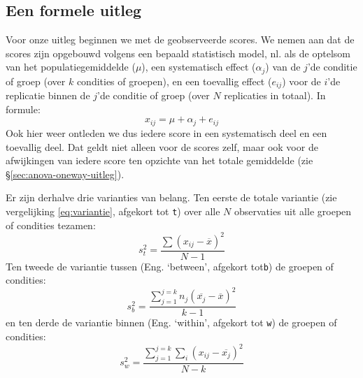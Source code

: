 \documentclass[
]{book}
\begin{document}
\subsection{Een formele uitleg}\label{sec:anova-oneway-formeel}

Voor onze uitleg beginnen we met de geobserveerde scores. We nemen aan
dat de scores zijn opgebouwd volgens een bepaald statistisch model, nl.
als de optelsom van het populatiegemiddelde (\(\mu\)), een systematisch
effect (\(\alpha_j\)) van de \(j\)'de conditie of groep (over \(k\) condities
of groepen), en een toevallig effect (\(e_{ij}\)) voor de \(i\)'de
replicatie binnen de \(j\)'de conditie of groep (over \(N\) replicaties in
totaal). In formule:
\[x_{ij} = \mu + \alpha_{j} + e_{ij}\]
Ook hier
weer ontleden we dus iedere score in een systematisch deel en een
toevallig deel. Dat geldt niet alleen voor de scores zelf, maar ook voor
de afwijkingen van iedere score ten opzichte van het totale gemiddelde
(zie §\ref{sec:anova-oneway-uitleg}).

Er zijn derhalve drie varianties van belang. Ten eerste de totale
variantie (zie vergelijking
\eqref{eq:variantie}, afgekort tot \texttt{t}) over alle \(N\)
observaties uit alle groepen of condities tezamen:
\begin{equation}
  \label{eq:MStotal}
    s^2_t = \frac{ \sum (x_{ij} - \overline{x})^2 } {N-1}
\end{equation}
Ten tweede de variantie tussen (Eng. `between', afgekort tot\texttt{b}) de
groepen of condities:
\begin{equation}
  \label{eq:MSbetween}
    s^2_b = \frac{ \sum_{j=1}^{j=k} n_j (\overline{x_j} - \overline{x})^2 } {k-1}
\end{equation}
en ten derde de variantie binnen (Eng. `within', afgekort tot \texttt{w}) de
groepen of condities:
\begin{equation}
  \label{eq:MSwithin}
    s^2_w = \frac{ \sum_{j=1}^{j=k} \sum_i (x_{ij} - \overline{x_j})^2 } {N-k}
\end{equation}
\end{document}
